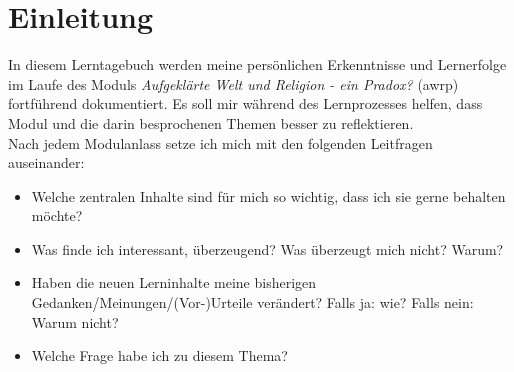 \section*{Einleitung}
In diesem Lerntagebuch werden meine persönlichen Erkenntnisse und Lernerfolge im Laufe des Moduls \textit{Aufgeklärte Welt und Religion - ein Pradox?} (awrp) fortführend dokumentiert. Es soll mir während des Lernprozesses helfen, dass Modul und die darin besprochenen Themen besser zu reflektieren. \\

Nach jedem Modulanlass setze ich mich mit den folgenden Leitfragen auseinander:\\
\begin{itemize}
\item Welche zentralen Inhalte sind für mich so wichtig, dass ich sie gerne behalten möchte?\\
\item Was finde ich interessant, überzeugend? Was überzeugt mich nicht? Warum?\\
\item Haben die neuen Lerninhalte meine bisherigen Gedanken/Meinungen/(Vor-)Urteile verändert? Falls ja: wie? Falls nein: Warum nicht?\\
\item Welche Frage habe ich zu diesem Thema?
\end{itemize}
